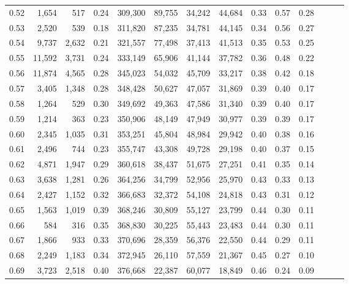 \begin{tabular}{rrrrrrrrrrrrrr}
0.52 &   1,654 &    517 &  0.24 &  309,300 &   89,755 &  34,242 &  44,684 &  0.33 &  0.57 &      0.28 \\
0.53 &   2,520 &    539 &  0.18 &  311,820 &   87,235 &  34,781 &  44,145 &  0.34 &  0.56 &      0.27 \\
0.54 &   9,737 &  2,632 &  0.21 &  321,557 &   77,498 &  37,413 &  41,513 &  0.35 &  0.53 &      0.25 \\
0.55 &  11,592 &  3,731 &  0.24 &  333,149 &   65,906 &  41,144 &  37,782 &  0.36 &  0.48 &      0.22 \\
0.56 &  11,874 &  4,565 &  0.28 &  345,023 &   54,032 &  45,709 &  33,217 &  0.38 &  0.42 &      0.18 \\
0.57 &   3,405 &  1,348 &  0.28 &  348,428 &   50,627 &  47,057 &  31,869 &  0.39 &  0.40 &      0.17 \\
0.58 &   1,264 &    529 &  0.30 &  349,692 &   49,363 &  47,586 &  31,340 &  0.39 &  0.40 &      0.17 \\
0.59 &   1,214 &    363 &  0.23 &  350,906 &   48,149 &  47,949 &  30,977 &  0.39 &  0.39 &      0.17 \\
0.60 &   2,345 &  1,035 &  0.31 &  353,251 &   45,804 &  48,984 &  29,942 &  0.40 &  0.38 &      0.16 \\
0.61 &   2,496 &    744 &  0.23 &  355,747 &   43,308 &  49,728 &  29,198 &  0.40 &  0.37 &      0.15 \\
0.62 &   4,871 &  1,947 &  0.29 &  360,618 &   38,437 &  51,675 &  27,251 &  0.41 &  0.35 &      0.14 \\
0.63 &   3,638 &  1,281 &  0.26 &  364,256 &   34,799 &  52,956 &  25,970 &  0.43 &  0.33 &      0.13 \\
0.64 &   2,427 &  1,152 &  0.32 &  366,683 &   32,372 &  54,108 &  24,818 &  0.43 &  0.31 &      0.12 \\
0.65 &   1,563 &  1,019 &  0.39 &  368,246 &   30,809 &  55,127 &  23,799 &  0.44 &  0.30 &      0.11 \\
0.66 &     584 &    316 &  0.35 &  368,830 &   30,225 &  55,443 &  23,483 &  0.44 &  0.30 &      0.11 \\
0.67 &   1,866 &    933 &  0.33 &  370,696 &   28,359 &  56,376 &  22,550 &  0.44 &  0.29 &      0.11 \\
0.68 &   2,249 &  1,183 &  0.34 &  372,945 &   26,110 &  57,559 &  21,367 &  0.45 &  0.27 &      0.10 \\
0.69 &   3,723 &  2,518 &  0.40 &  376,668 &   22,387 &  60,077 &  18,849 &  0.46 &  0.24 &      0.09 \\

\end{tabular}
